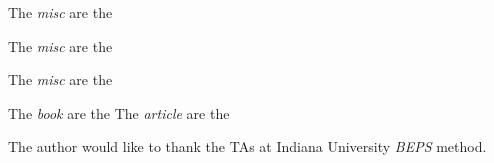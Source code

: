 \documentclass[sigconf]{acmart}
\begin{document}
 \cite{vanGundy09}
The \textit{misc} are the \cite{www-google}

The \textit{misc} are the \cite{www-google1}

The \textit{misc} are the \cite{www-google2}

The \textit{book} are the \cite{book}
The \textit{article} are the \cite{article1}
\begin{acks}

  The author would like to thank the TAs at Indiana University \textit{BEPS} method.

\end{acks}


 
\end{document}
